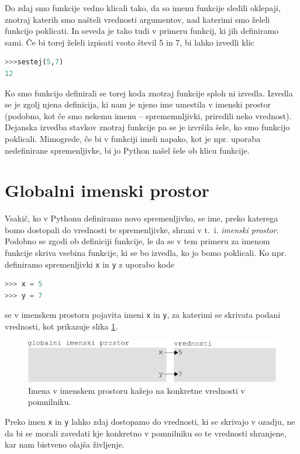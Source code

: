 Do zdaj smo funkcije vedno klicali tako, da so imenu funkcije sledili oklepaji, znotraj katerih smo našteli vrednosti argumentov, nad katerimi smo želeli funkcijo poklicati. In seveda je tako tudi v primeru funkcij, ki jih definiramo sami. Če bi torej želeli izpisati vsoto števil 5 in 7, bi lahko izvedli klic
\begin{lstlisting}[language=Python]
>>>sestej(5,7)
12
\end{lstlisting}

Ko smo funkcijo definirali se torej koda znotraj funkcije sploh ni izvedla. Izvedla se je zgolj njena definicija, ki nam je njeno ime umestila v imenski prostor (podobno, kot če smo nekemu imenu -- sprememnljivki, priredili neko vrednost). Dejanska izvedba stavkov znotraj funkcije pa se je izvršila šele, ko smo funkcijo poklicali. Mimogrede, če bi v funkciji imeli napako, kot je npr. uporaba nedefinirane spremenljivke, bi jo Python našel šele ob klicu funkcije.

\section{Globalni imenski prostor}
Vsakič, ko v Pythonu definiramo novo spremenljivko, se ime, preko katerega bomo dostopali do vrednosti te spremenljivke, shrani v t.~i. \emph{imenski prostor}. Podobno se zgodi ob definiciji funkcije, le da se v tem primeru za imenom funkcije skriva vsebina funkcije, ki se bo izvedla, ko jo bomo poklicali. Ko npr. definiramo spremenljivki \texttt{x} in \texttt{y} z uporabo kode
\begin{lstlisting}[language=Python]
>>> x = 5
>>> y = 7
\end{lstlisting}
se v imenskem prostoru pojavita imeni \texttt{x} in \texttt{y}, za katerimi se skrivata podani vrednosti, kot prikazuje slika \ref{img:imenski_prostor_1}.
\begin{figure}
    \includegraphics[width=\linewidth]{img/imenski_prostor.pdf}
    \caption{Imena v imenskem prostoru kažejo na konkretne vrednosti v pomnilniku.}
    \label{img:imenski_prostor_1}
\end{figure}
Preko imen \texttt{x} in \texttt{y} lahko zdaj dostopamo do vrednosti, ki se skrivajo v ozadju, ne da bi se morali zavedati kje konkretno v pomnilniku so te vrednosti shranjene, kar nam bistveno olajša življenje.

